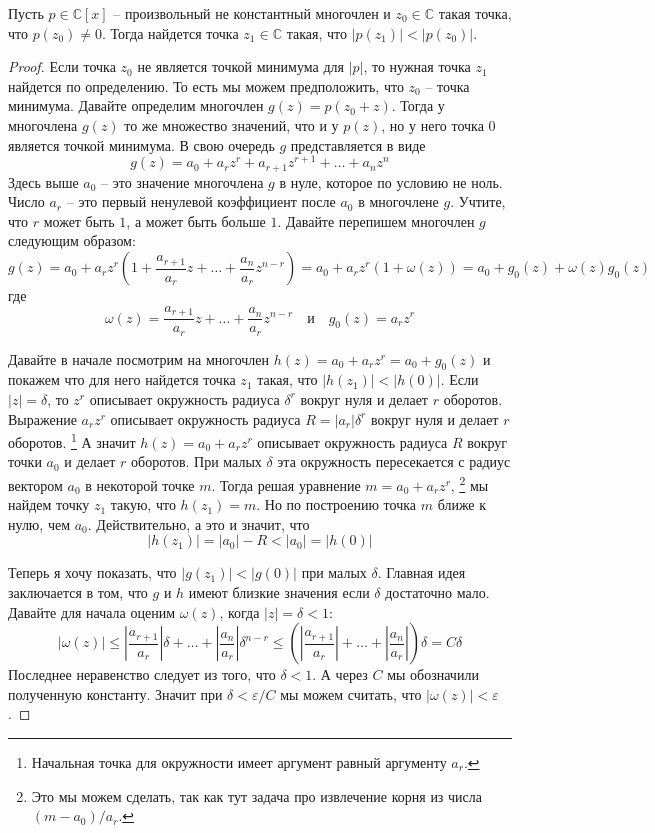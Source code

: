 \begin{claim}
\label{claim::PolyMinIsZero}
Пусть $p\in\mathbb C[x]$ -- произвольный не константный многочлен и $z_0\in \mathbb C$ такая точка, что $p(z_0)\neq 0$.
Тогда найдется точка $z_1\in \mathbb C$ такая, что $|p(z_1)|<|p(z_0)|$.
\end{claim}
\begin{proof}
Если точка $z_0$ не является точкой минимума для $|p|$, то нужная точка $z_1$ найдется по определению.
То есть мы можем предположить, что $z_0$ -- точка минимума.
Давайте определим многочлен $g(z) = p(z_0 + z)$.
Тогда у многочлена $g(z)$ то же множество значений, что и у $p(z)$, но у него точка $0$ является точкой минимума.
В свою очередь $g$ представляется в виде
\[
g(z) = a_0 + a_r z^r + a_{r+1}z^{r+1} + \ldots + a_n z^n
\]
Здесь выше $a_0$ -- это значение многочлена $g$ в нуле, которое по условию не ноль.
Число $a_r$ -- это первый ненулевой коэффициент после $a_0$ в многочлене $g$.
Учтите, что $r$ может быть $1$, а может быть больше $1$.
Давайте перепишем многочлен $g$ следующим образом:
\[
g(z) = a_0 + a_r z^r\left(1 + \frac{a_{r+1}}{a_r}z + \ldots + \frac{a_n}{a_r} z^{n-r}\right) = a_0 + a_r z^r\left(1 + \omega(z) \right) = a_0 + g_0(z) + \omega(z) g_0(z)
\]
где
\[
\omega(z) =  \frac{a_{r+1}}{a_r}z + \ldots + \frac{a_n}{a_r} z^{n-r}\quad \text{и} \quad g_0(z) = a_rz^r
\]

Давайте в начале посмотрим на многочлен $h(z) = a_0 + a_r z^r = a_0 + g_0(z)$ и покажем что для  него найдется точка $z_1$ такая, что $|h(z_1)| < |h(0)|$.
Если $|z| = \delta$, то $z^r$ описывает окружность радиуса $\delta^r$ вокруг нуля и делает $r$ оборотов.
Выражение $a_r z^r$ описывает окружность радиуса $R = |a_r|\delta^r$ вокруг нуля и делает $r$ оборотов.%
\footnote{Начальная точка для окружности имеет аргумент равный аргументу $a_r$.}
А значит $h(z) = a_0 + a_r z^r$ описывает окружность радиуса $R$ вокруг точки $a_0$ и делает $r$ оборотов.
При малых $\delta$ эта окружность пересекается с радиус вектором $a_0$ в некоторой точке $m$.
Тогда решая уравнение $m = a_0 + a_r z^r$,%
\footnote{Это мы можем сделать, так как тут задача про извлечение корня из числа $(m - a_0) / a_r$.}
мы найдем точку $z_1$ такую, что $h(z_1) = m$.
Но по построению точка $m$ ближе к нулю, чем $a_0$.
Действительно, а это и значит, что 
\[
|h(z_1)| = |a_0| - R < |a_0| = |h(0)|
\]

Теперь я хочу показать, что $|g(z_1)| < |g(0)|$ при малых $\delta$.
Главная идея заключается в том, что $g$ и $h$ имеют близкие значения если $\delta$ достаточно мало.
Давайте для начала оценим $\omega(z)$, когда $|z| = \delta < 1$:
\[
|\omega(z)| \leqslant \left| \frac{a_{r+1}}{a_r}\right| \delta + \ldots + \left|\frac{a_n}{a_r}\right| 
\delta^{n-r}\leqslant \left(\left| \frac{a_{r+1}}{a_r}\right|  + \ldots + \left|\frac{a_n}{a_r}\right|\right) 
\delta = C \delta
\]
Последнее неравенство следует из того, что $\delta < 1$.
А через $C$ мы обозначили полученную константу.
Значит при $\delta < \varepsilon / C$ мы можем считать, что $|\omega(z)| < \varepsilon$.


\end{proof}
